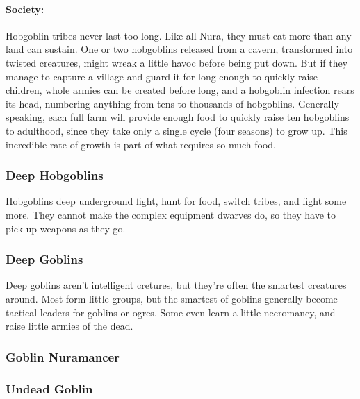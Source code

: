 \paragraph{Society:} Hobgoblin tribes never last too long.  Like all Nura, they must eat more than any land can sustain.  One or two hobgoblins released from a cavern, transformed into twisted creatures, might wreak a little havoc before being put down.  But if they manage to capture a village and guard it for long enough to quickly raise children, whole armies can be created before long, and a hobgoblin infection rears its head, numbering anything from tens to thousands of hobgoblins.  Generally speaking, each full farm will provide enough food to quickly raise ten hobgoblins to adulthood, since they take only a single cycle (four seasons) to grow up.  This incredible rate of growth is part of what requires so much food.
  
\subsubsection{Deep Hobgoblins}\label{deep_hobgoblin}

Hobgoblins deep underground fight, hunt for food, switch tribes, and fight some more.  They cannot make the complex equipment dwarves do, so they have to pick up weapons as they go.

\deephobgoblin

\subsubsection{Deep Goblins}\label{deep_goblin}

Deep goblins aren't intelligent cretures, but they're often the smartest creatures around.  Most form little groups, but the smartest of goblins generally become tactical leaders for goblins or ogres.  Some even learn a little necromancy, and raise little armies of the dead.

\deepgoblin

\subsubsection{Goblin Nuramancer}
\goblinnuramancer

\subsubsection{Undead Goblin}

\undeadgoblin

